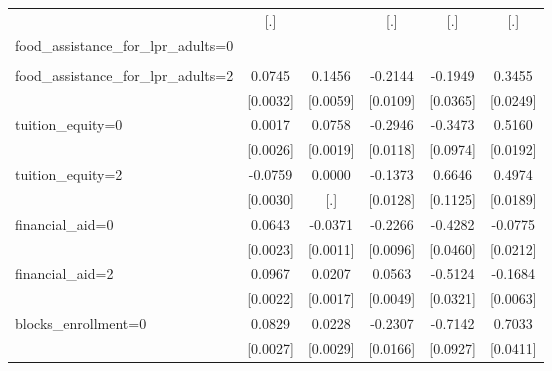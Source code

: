 \begin{table}[htbp]
\begin{tabular}{l*{5}{c}}
                    &         [.]         &                     &         [.]         &         [.]         &         [.]         \\
\addlinespace
food\_assistance\_for\_lpr\_adults=0&                     &                     &                     &                     &                     \\
                    &                     &                     &                     &                     &                     \\
\addlinespace
food\_assistance\_for\_lpr\_adults=2&      0.0745\sym{***}&      0.1456\sym{***}&     -0.2144\sym{***}&     -0.1949\sym{***}&      0.3455\sym{***}\\
                    &    [0.0032]         &    [0.0059]         &    [0.0109]         &    [0.0365]         &    [0.0249]         \\
\addlinespace
tuition\_equity=0    &      0.0017         &      0.0758\sym{***}&     -0.2946\sym{***}&     -0.3473\sym{***}&      0.5160\sym{***}\\
                    &    [0.0026]         &    [0.0019]         &    [0.0118]         &    [0.0974]         &    [0.0192]         \\
\addlinespace
tuition\_equity=2    &     -0.0759\sym{***}&      0.0000         &     -0.1373\sym{***}&      0.6646\sym{***}&      0.4974\sym{***}\\
                    &    [0.0030]         &         [.]         &    [0.0128]         &    [0.1125]         &    [0.0189]         \\
\addlinespace
financial\_aid=0     &      0.0643\sym{***}&     -0.0371\sym{***}&     -0.2266\sym{***}&     -0.4282\sym{***}&     -0.0775\sym{***}\\
                    &    [0.0023]         &    [0.0011]         &    [0.0096]         &    [0.0460]         &    [0.0212]         \\
\addlinespace
financial\_aid=2     &      0.0967\sym{***}&      0.0207\sym{***}&      0.0563\sym{***}&     -0.5124\sym{***}&     -0.1684\sym{***}\\
                    &    [0.0022]         &    [0.0017]         &    [0.0049]         &    [0.0321]         &    [0.0063]         \\
\addlinespace
blocks\_enrollment=0 &      0.0829\sym{***}&      0.0228\sym{***}&     -0.2307\sym{***}&     -0.7142\sym{***}&      0.7033\sym{***}\\
                    &    [0.0027]         &    [0.0029]         &    [0.0166]         &    [0.0927]         &    [0.0411]         \\

\end{tabular}
\end{table}
